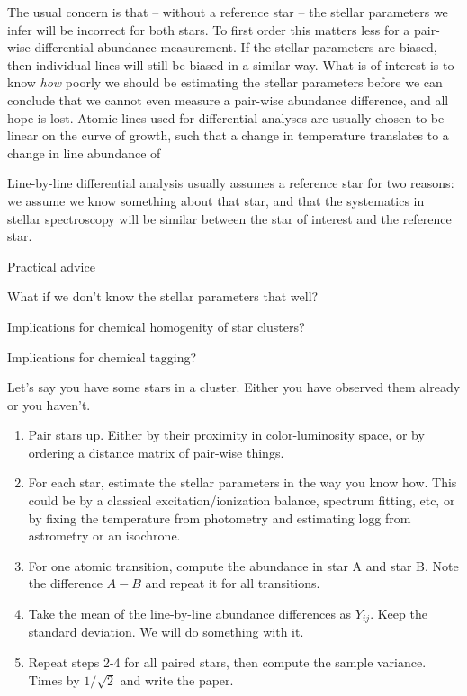 \documentclass[modern]{aastex631}
\newcommand{\todo}[1]{\textcolor{tab:red}{#1}}
\begin{document}
The usual concern is that -- without a reference star -- the stellar parameters we infer will be incorrect for both stars. To first order this matters less for a pair-wise differential abundance measurement. If the stellar parameters are biased, then individual lines will still be biased in a similar way. What is of interest is to know \emph{how} poorly we should be estimating the stellar parameters before we can conclude that we cannot even measure a pair-wise abundance difference, and all hope is lost. Atomic lines used for differential analyses are usually chosen to be linear on the curve of growth, such that a change in temperature translates to a change in line abundance of

\todo{Line-by-line differential analysis usually assumes a reference star for two reasons: we assume we know something about  that star, and that the systematics in stellar spectroscopy will be similar between the star of interest and the reference star.}

\todo{Practical advice}

\todo{What if we don't know the stellar parameters that well?}

\todo{Implications for chemical homogenity of star clusters?}

\todo{Implications for chemical tagging?}

Let's say you have some stars in a cluster. Either you have observed them already or you haven't.
\begin{enumerate}
    \item Pair stars up. Either by their proximity in color-luminosity space, or by ordering a distance matrix of pair-wise things.
    \item For each star, estimate the stellar parameters in the way you know how. This could be by a classical excitation/ionization balance, spectrum fitting, etc, or by fixing the temperature from photometry and estimating logg from astrometry or an isochrone.
    \item For one atomic transition, compute the abundance in star A and star B. Note the difference $A-B$ and repeat it for all transitions.
    \item Take the mean of the line-by-line abundance differences as $Y_{ij}$. Keep the standard deviation. We will do something with it.
    \item Repeat steps 2-4 for all paired stars, then compute the sample variance. Times by $1/\sqrt{2}$ and write the paper.
\end{enumerate}
\end{document}
